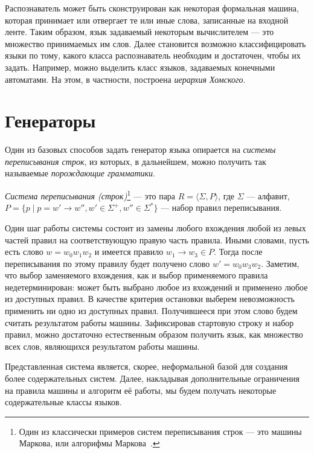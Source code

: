 Распознаватель может быть сконструирован как некоторая формальная машина, которая принимает или отвергает те или иные слова, записанные на входной ленте.
Таким образом, язык задаваемый некоторым вычислителем --- это множество принимаемых им слов.
Далее становится возможно классифицировать языки по тому, какого класса распознаватель необходим и достаточен, чтобы их задать.
Например, можно выделить класс языков, задаваемых конечными автоматами.
На этом, в частности, построена \textit{иерархия Хомского}.





\section{Генераторы}

Один из базовых способов задать генератор языка опирается на \textit{системы переписывания строк}, из которых, в дальнейшем, можно получить так называемые \textit{порождающие грамматики}.

\begin{definition}
  \textit{Система переписывания (строк)}\footnote{Один из классически примеров систем переписывания строк --- это машины Маркова, или алгорифмы Маркова~\cite{markov1954theory}.} --- это пара $R = \langle \Sigma, P  \rangle$, где $\Sigma$ --- алфавит, $P= \{p \mid p = w' \to w'', w' \in \Sigma^+, w'' \in \Sigma^*\}$ --- набор правил переписывания.
\end{definition}

Один шаг работы системы состоит из замены любого вхождения любой из левых частей правил на соответствующую правую часть правила.
Иными словами, пусть есть слово $w = w_0w_1w_2$ и имеется правило $w_1 \to w_3 \in P$.
Тогда после переписывания по этому правилу будет получено слово $w' = w_0w_3w_2$.
Заметим, что выбор заменяемого вхождения, как и выбор применяемого правила недетерминирован: может быть выбрано любое из вхождений и применено любое из доступных правил.
В качестве критерия остановки выберем невозможность применить ни одно из доступных правил.
Получившееся при этом слово будем считать результатом работы машины.
Зафиксировав стартовую строку и набор правил, можно достаточно естественным образом получить язык, как множество всех слов, являющихся результатом работы машины.

Представленная система является, скорее, неформальной базой для создания более содержательных систем.
Далее, накладывая дополнительные ограничения на правила машины и алгоритм её работы, мы будем получать некоторые содержательные классы языков.

